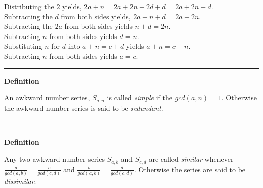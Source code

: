 \documentclass[a4paper,12pt]{article}
\begin{document}
\noindent Distributing the $2$ yields, $2a + n = 2a + 2n - 2d + d = 2a + 2n - d$.\\

\noindent Subtracting the $d$ from both sides yields, $2a + n + d = 2a + 2n$.\\

\noindent Subtracting the $2a$ from both sides yields $n + d = 2n$.\\

\noindent Subtracting $n$ from both sides yields $d = n$.\\

\noindent Substituting $n$ for $d$ into $a + n = c + d$ yields $a + n = c + n$.\\

\noindent Subtracting $n$ from both sides yields $a = c$.

\begin{center}
\noindent\rule{8cm}{0.4pt}
\end{center}










\label{definition:simple_and_redundant_series}
\hypertarget{definition:simple_and_redundant_series}{}
\begin{tcolorbox}
\textbf{Definition}

An awkward number series, $S_{a,n}$ is called \textit{simple} if the $gcd(a,n) = 1$. Otherwise the awkward number series is said to be \textit{redundant}.

\end{tcolorbox}
\noindent \\









\label{definition:similar_series}
\hypertarget{definition:similar_series}{}
\begin{tcolorbox}
\textbf{Definition}

Any two awkward number series $S_{a,b}$ and $S_{c,d}$ are called \textit{similar} whenever $\frac{a}{gcd(a,b)} = \frac{c}{gcd(c,d)}$ and $\frac{b}{gcd(a,b)} = \frac{d}{gcd(c,d)}$. Otherwise the series are said to be \textit{dissimilar}.

\end{tcolorbox}
\noindent \\
\end{document}
